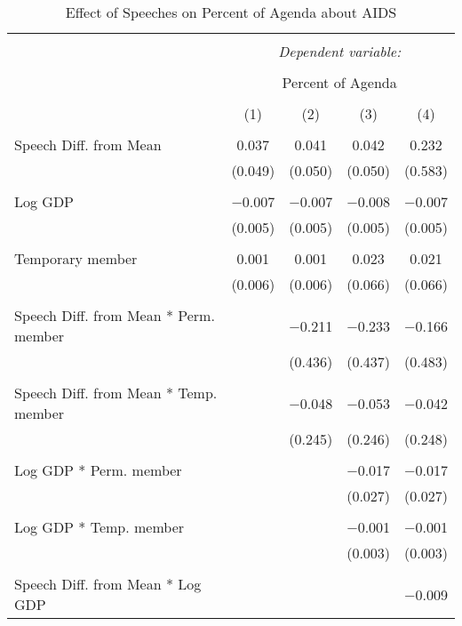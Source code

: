 
\begin{table}[!htbp] \centering 
  \caption{Effect of Speeches on Percent of Agenda about AIDS} 
  \label{} 
\begin{tabular}{@{\extracolsep{5pt}}lcccc} 
\\[-1.8ex]\hline 
\hline \\[-1.8ex] 
 & \multicolumn{4}{c}{\textit{Dependent variable:}} \\ 
\cline{2-5} 
\\[-1.8ex] & \multicolumn{4}{c}{Percent of Agenda} \\ 
\\[-1.8ex] & (1) & (2) & (3) & (4)\\ 
\hline \\[-1.8ex] 
 Speech Diff. from Mean & 0.037 & 0.041 & 0.042 & 0.232 \\ 
  & (0.049) & (0.050) & (0.050) & (0.583) \\ 
  & & & & \\ 
 Log GDP & $-$0.007 & $-$0.007 & $-$0.008 & $-$0.007 \\ 
  & (0.005) & (0.005) & (0.005) & (0.005) \\ 
  & & & & \\ 
 Temporary member & 0.001 & 0.001 & 0.023 & 0.021 \\ 
  & (0.006) & (0.006) & (0.066) & (0.066) \\ 
  & & & & \\ 
 Speech Diff. from Mean * Perm. member &  & $-$0.211 & $-$0.233 & $-$0.166 \\ 
  &  & (0.436) & (0.437) & (0.483) \\ 
  & & & & \\ 
 Speech Diff. from Mean * Temp. member &  & $-$0.048 & $-$0.053 & $-$0.042 \\ 
  &  & (0.245) & (0.246) & (0.248) \\ 
  & & & & \\ 
 Log GDP * Perm. member &  &  & $-$0.017 & $-$0.017 \\ 
  &  &  & (0.027) & (0.027) \\ 
  & & & & \\ 
 Log GDP * Temp. member &  &  & $-$0.001 & $-$0.001 \\ 
  &  &  & (0.003) & (0.003) \\ 
  & & & & \\ 
 Speech Diff. from Mean * Log GDP &  &  &  & $-$0.009 \\ 

\end{tabular}
\end{table}

